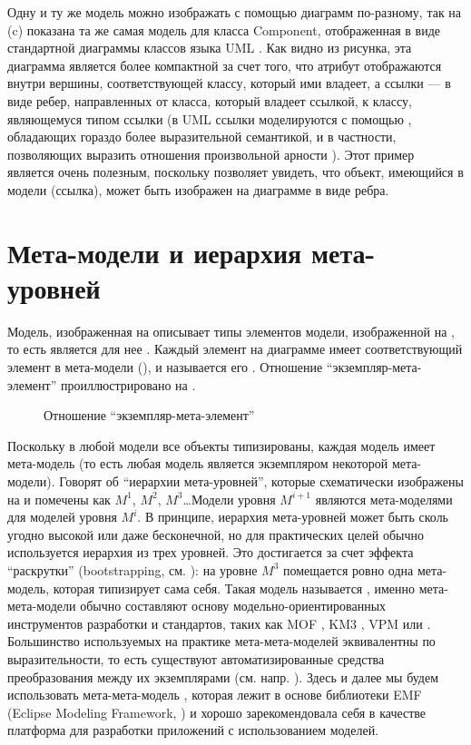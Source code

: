 Одну и ту же модель можно изображать с помощью диаграмм по-разному, так на  (c) показана та же самая модель для класса Component, отображенная в виде стандартной диаграммы классов языка UML \cite{UML}. Как видно из рисунка, эта диаграмма является более компактной за счет того, что атрибут отображаются внутри вершины, соответствующей классу, который ими владеет, а ссылки --- в виде ребер, направленных от класса, который владеет ссылкой, к классу, являющемуся типом ссылки (в UML ссылки моделируются с помощью , обладающих гораздо более выразительной семантикой, и в частности, позволяющих выразить отношения произвольной арности \cite{???}). Этот пример является очень полезным, поскольку позволяет увидеть, что объект, имеющийся в модели (ссылка), может быть изображен на диаграмме в виде ребра.

\section{Мета-модели и иерархия мета-уровней}

Модель, изображенная на  описывает типы элементов модели, изображенной на , то есть является для нее . Каждый элемент на диаграмме  имеет соответствующий элемент в мета-модели (), и называется его . Отношение ``экземпляр-мета-элемент'' проиллюстрировано на .

\begin{figure}[htbp]
\caption{Отношение ``экземпляр-мета-элемент''}\label{ConformsToRelation}
\end{figure}

Поскольку в любой модели все объекты типизированы, каждая модель имеет мета-модель  (то есть любая модель является экземпляром некоторой мета-модели). Говорят об ``иерархии мета-уровней'', которые схематически изображены на   и помечены как $M^1$, $M^2$, $M^3$\ldots Модели уровня $M^{i+1}$ являются мета-моделями для моделей уровня $M^i$. В принципе, иерархия мета-уровней может быть сколь угодно высокой или даже бесконечной, но для практических целей обычно используется иерархия из трех уровней. Это достигается за счет эффекта ``раскрутки'' (bootstrapping, см. \cite{Wirth}): на уровне $M^3$ помещается ровно одна мета-модель, которая типизирует сама себя. Такая модель называется , именно мета-мета-модели обычно составляют основу модельно-ориентированных инструментов разработки и стандартов, таких как MOF \cite{MOF}, KM3 \cite{KM3}, VPM \cite{VPM} или  \cite{EMF}. Большинство используемых на практике мета-мета-моделей эквивалентны по выразительности, то есть существуют автоматизированные средства преобразования между их экземплярами (см. напр. \cite{KM3}). Здесь и далее мы будем использовать мета-мета-модель , которая лежит в основе библиотеки EMF (Eclipse Modeling Framework, \cite{EMF}) и хорошо зарекомендовала себя в качестве платформа для разработки приложений с использованием моделей.

